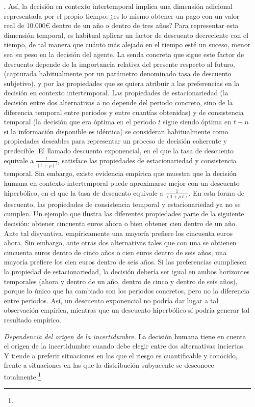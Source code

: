 \documentclass[10pt,a4paper]{article}
\newcounter{numitem}
\newenvironment{lnum}
      {\begin{list}{\arabic{numitem}.}{%
          \usecounter{numitem}%
          \setlength{\leftmargin}{1cm}%
          \setlength{\parskip}{3pt}%
          \setlength{\itemsep}{0pt}%
          \setlength{\parsep}{0pt}%
      }}
      {\end{list}}
\begin{document}
\begin{lnum}
{        Así, la decisión en contexto intertemporal implica una dimensión adicional representada por el propio tiempo: ¿es lo mismo obtener un pago con un valor real de 10.000€ dentro de un año o dentro de tres años? Para representar esta dimensión temporal, es habitual aplicar un factor de descuento decreciente con el tiempo, de tal manera que cuánto más alejado en el tiempo esté un suceso, menor sea su peso en la decisión del agente. La senda concreta que sigue este factor de descuento depende de la importancia relativa del presente respecto al futuro, (capturada habitualmente por un parámetro denominado tasa de descuento subjetivo), y por las propiedades que se quiera atribuir a las preferencias en la decisión en contexto intertemporal. Las propiedades de estacionariedad (la decisión entre dos alternativas a no depende del periodo concreto, sino de la diferencia temporal entre periodos y entre cuantías obtenidas) y de consistencia temporal (la decisión que era óptima en el periodo $t$ sigue siendo óptima en $t+n$ si la información disponible es idéntica) se consideran habitualmente como propiedades deseables para representar un proceso de decisión coherente y predecible. El llamado descuento exponencial, en el que la tasa de descuento equivale a $\frac{1}{(1+\rho)^t}$, satisface las propiedades de estacionariedad y consistencia temporal. Sin embargo, existe evidencia empírica que muestra que la decisión humana en contexto intertemporal puede aproximarse mejor con un descuento hiperbólico, en el que la tasa de descuento equivale a $\frac{1}{(1+\rho \; t)}$. En esta forma de descuento, las propiedades de consistencia temporal y estacionariedad ya no se cumplen. Un ejemplo que ilustra las diferentes propiedades parte de la siguiente decisión: obtener cincuenta euros ahora o bien obtener cien dentro de un año. Ante tal disyuntiva, empíricamente una mayoría prefiere los cincuenta euros ahora. Sin embargo, ante otras dos alternativas tales que con una se obtienen cincuenta euros dentro de cinco años o cien euros dentro de seis años, una mayoría prefiere los cien euros dentro de seis años. Si las preferencias cumpliesen la propiedad de estacionariedad, la decisión debería ser igual en ambos horizontes temporales (ahora y dentro de un año, dentro de cinco y dentro de seis años), porque lo único que ha cambiado son los periodos concretos, pero no la diferencia entre periodos. Así, un descuento exponencial no podría dar lugar a tal observación empírica, mientras que un descuento hiperbólico sí podría generar tal resultado empírico.
    }
    \item \textit{Dependencia del origen de la incertidumbre.} La decisión humana tiene en cuenta el origen de la incertidumbre cuando debe elegir entre dos alternativas inciertas. Y tiende a preferir situaciones en las que el riesgo es cuantificable y conocido, frente a situaciones en las que la distribución subyacente se desconoce totalmente.\footnote{%
}
\end{lnum}
\end{document}
